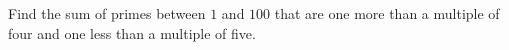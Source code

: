 Find the sum of primes between $1$ and $100$ that are one more than a multiple of four and one less than a multiple of five.
